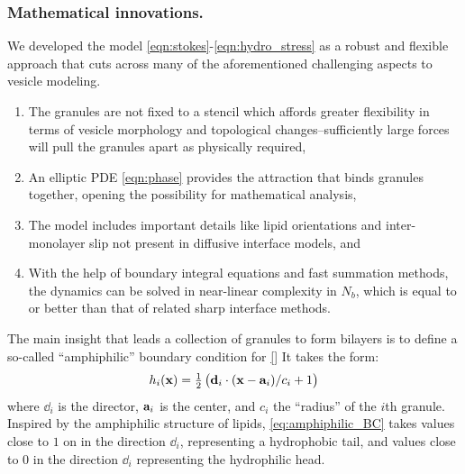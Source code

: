 \subsubsection{Mathematical innovations.}
We developed the model \eqref{eqn:stokes}-\eqref{eqn:hydro_stress} 
as a robust and flexible approach
that cuts across many of the aforementioned challenging aspects to vesicle modeling.
\begin{enumerate}
\item The granules are not fixed to a stencil which
affords greater flexibility in terms of vesicle morphology 
and topological changes--sufficiently large forces will pull the granules apart 
as physically required,
\item An elliptic PDE \eqref{eqn:phase} provides the attraction that binds granules together,
opening the possibility for mathematical analysis, 
\item The model includes important details like lipid orientations and inter-monolayer
slip not present in diffusive interface models, and
\item With the help of boundary integral equations
and fast summation methods, the dynamics can be solved in 
near-linear complexity in $N_b$, which is equal to or better than 
that of related sharp interface methods. 
\end{enumerate}
The main insight that leads a collection of granules to form bilayers
is to define a so-called ``amphiphilic'' boundary condition for \eqref{}
It takes the form:
\begin{equation}
\label{eq:amphiphilic_BC}
h_i(\mathbf{x}) = \tfrac{1}{2}\left(\dd_i \cdot (\xx - \aa_i)/c_i + 1\right)
\end{equation}
where $\dd_i$ is the director, $\aa_i$ is the center, and $c_i$ the
``radius'' of the $i$th granule.  Inspired
by the amphiphilic structure of lipids, 
\eqref{eq:amphiphilic_BC} 
takes values close to $1$ on in the direction $\dd_i$,
representing a hydrophobic tail, and values close to $0$ 
in the direction $\dd_i$ representing the hydrophilic head.


